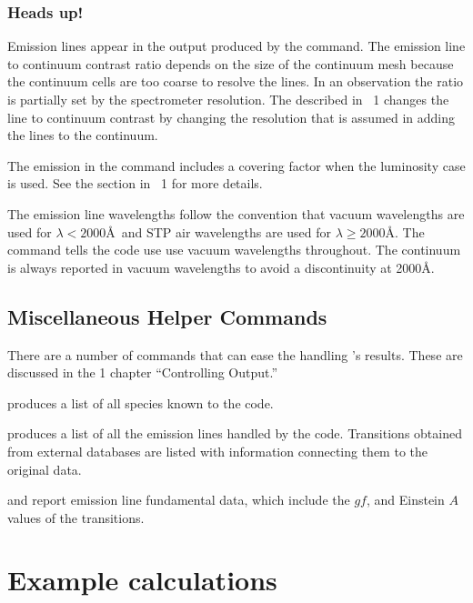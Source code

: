 \documentclass[12pt,twoside]{article}
\begin{document}
\subsubsection{Heads up!}

Emission lines appear in the output produced by the
 command.
The emission line to continuum contrast ratio depends on the size
of the continuum mesh because the continuum cells are too coarse to resolve
the lines.  
In an observation the ratio is partially set by the spectrometer resolution.
The  described in \Hazy\ 1 changes the 
line to continuum contrast by changing the
resolution that is assumed in adding the lines to the continuum.  

The emission in the  command includes
a covering factor when the luminosity case is used.  
See the section  in \Hazy\ 1 for more details.

The emission line wavelengths follow the convention that vacuum wavelengths
are used for $\lambda < 2000$\AA\ and STP air wavelengths are used
for $\lambda \ge 2000$\AA.
The  command tells the code use use vacuum wavelengths throughout.
The continuum is always reported in vacuum wavelengths to avoid 
a discontinuity at 2000\AA.

\subsection{Miscellaneous Helper Commands}
\label{sec:MiscHelperCommands}

There are a number of commands that can ease the handling \Cloudy's results.
These are discussed in the \Hazy{} 1 chapter ``Controlling Output.'' 

 produces a list of all species
known to the code.

 produces a list of all the emission lines
handled by the code.  Transitions obtained from external databases are
listed with information connecting them to the original data.

 and  report
emission line fundamental data, which include the $gf$, and Einstein
$A$ values of the transitions.

\section{Example calculations}
\label{sec:ExampleCalculations}
\end{document}

